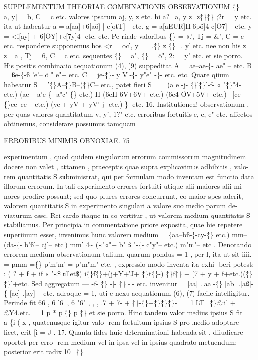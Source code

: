 \documentclass[12pt,a4paper]{article}
\begin{document}
 SUPPLEMENTUM THEORIAE COMBINATIONIS OBSERVATIONUM
\^\{\} = a, y] = b, C = c etc.
valores ipsarum aj, y, z etc. hi
a?=a, y z=z\^\{\}\^\{\} ;2r = y etc.
ita ut habeatur
a = a[aa]+6[aö]-|-c[otT]+ etc.
g = a[aEUR]H-6pö]4-c[Ö7]+ etc.
y = <i[ay] + 6[ÖY]+c[7y]4- etc.
etc. Pe rinde valoribus
\^\{\} = «.', Tj = \&', C = c etc.
respondere supponemus hos
<r = oc', y ==.\^\{\} z \^\{\}=. y' etc.
nee non his
z z= a , Tj = 6, C = c etc.
sequentes
\^\{\} = a", \^\{\} = ö", 2: = y" etc.
et sie porro.
His positis combinatio aequationum (4), (9) suppeditat
A = ae--ae-\{- ae" -- etc.
B = ße-\{-ß 'e'-- ö " e"+ etc.
C = je-\^\{\}- y V -\{- y"e" -\}- etc.
etc. Quare qiium habeatur S = '\^\{\}A--\^\{\}B--(\^\{\}C-- etc., patet fieri
S == (a e -j- \^\{\}'\^\{\}'-f- « "\^\{\}"4- etc.) (ae -- a'e-\{- a"e"-\^\{\} etc.)
H-(6eH-6V+6V+ etc.) (6e4-ÖV+öV+ etc.)
--[ce-\^\{\}ce--ce -- etc.) (ye + yV + yV'-j- etc.)-\}- etc.
16.
Institutionen! observationum , per quas valores quantitatum v, y', 1?" etc.
erroribus fortuitis e, e, e" etc. affectos obtinemus, considerare possumus tamquam

\newpage
\begin{center}
\textsc{ERRORIBUS MINIMIS OBNOXIAE. 75}
\end{center}
experimentum , quod quidem singulorum errorum commissorum magnitudinem
docere non valet , attamen , praeceptis quae supra explicavimus adhibitis , valo-
rem quantitatis S subministrat, qui per formulam modo inventam est functio data
illorum errorum. In tali experimento errores fortuiti utique alii maiores alii mi-
nores prodire possunt; sed quo plures errores concurrunt, eo maior spes aderit,
valorem quantitatis S in experimento singulari a valore suo medio parum de-
viaturum esse. Rei cardo itaque in eo vertitur , ut valorem medium quantitatis
S stabiliamus. Per principia in commentatione priore exposita, quae hie repetere
superiiuum esset, invenimus hunc valorem medium
= \{aa--bß-\{-cy-\^\{\} etc.) mm--(da-\{- b'ß'-- cj'-- etc.) mm'
4\~{} («"«"+ b" ß "-\{- c"y"-- etc.) m"m"-- etc .
Denotando errorem medium observationum talium, quarum pondus = 1 , per l,
ita ut sit iiii. = pmm =\^\{\} p'm'm' = p"m"m" etc. , expressio modo inventa ita exhi-
beri potest:
: ( ? + f + if « '«\$ullet\$) i\^\{\}f\^\{\}+(j+Y+'J+ \^\{\}t\^\{\}-) \^\{\}f\^\{\}
+ (7 + y + f+etc.)(\^\{\}\^\{\}'+etc.
Sed aggregatum --- -f- \^\{\} -|- \^\{\} -|- etc. invenitur
= [aa] .[aa]-\^\{\} [ab] .[aß]-\{-[ac] .[ay] -- etc.
adeoque = 1, uti e nexu aequationum (6), (7) facile intelligitur. Perinde fit
66 , 6 '6' , 6 "6" , , ,
.7 + 7- + \^\{\}-\^\{\}+\^\{\}\^\{\}\^\{\}-== 1
LT\_\^\{\}£:i' + £Y4.etc. = 1
p * p \^\{\} p \^\{\}
et sie porro.
Hinc tandem valor medius ipsius S fit = a \{i ( x , quatenusque igitur valo-
rem fortuitum ipsius S pro medio adoptare licet, erit [i = J-.
17.
Quanta fides huic determinationi habenda sit , diiudicare oportet per erro-
rem medium vel in ipsa vel in ipsius quadrato metuendum: posterior erit radix
10=\^\{\}
\end{document}
